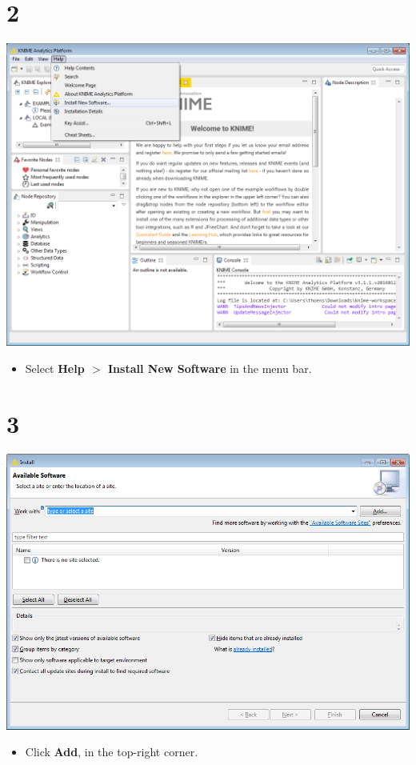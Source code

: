 \documentclass{beamer}
\begin{document}
\section{2}
\begin{frame}
	\begin{center}
  		\includegraphics[height=0.7\textheight]{2.png}
	\end{center}
	\begin{itemize}
		\item Select \textbf{Help $>$ Install New Software} in the menu bar.
	\end{itemize}
\end{frame}

\section{3}
\begin{frame}
	\begin{center}
  		\includegraphics[height=0.7\textheight]{3.png}
	\end{center}
	\begin{itemize}
		\item Click \textbf{Add}, in the top-right corner.
	\end{itemize}
\end{frame}
\end{document}
